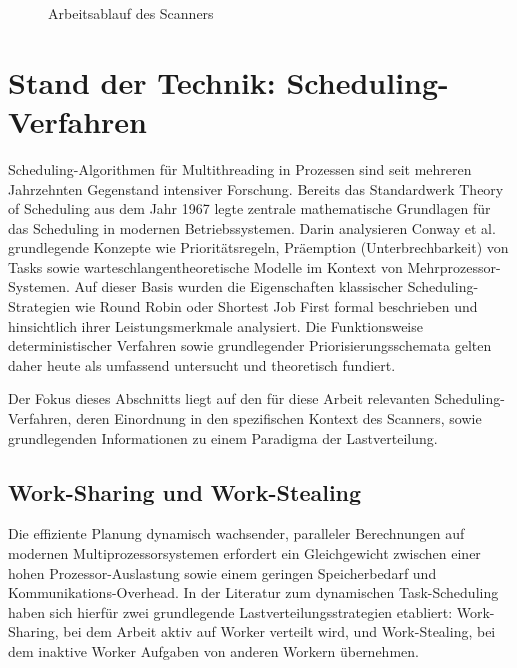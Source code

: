 \begin{sloppypar}
\begin{figure}[H]
{}
\caption{Arbeitsablauf des Scanners}
\label{fig:scanner-workflow}
\end{figure}



\section{Stand der Technik: Scheduling-Verfahren}

Scheduling-Algorithmen für Multithreading in Prozessen sind seit mehreren Jahrzehnten Gegenstand intensiver Forschung. 
Bereits das Standardwerk Theory of Scheduling aus dem Jahr 1967 \cite{Conway:1967} legte zentrale mathematische Grundlagen für das Scheduling in modernen Betriebssystemen. 
Darin analysieren Conway et al. grundlegende Konzepte wie Prioritätsregeln, Präemption (Unterbrechbarkeit) von Tasks sowie warteschlangentheoretische Modelle im Kontext von Mehrprozessor-Systemen. 
Auf dieser Basis wurden die Eigenschaften klassischer Scheduling-Strategien wie Round Robin oder Shortest Job First formal beschrieben und hinsichtlich ihrer Leistungsmerkmale analysiert. 
Die Funktionsweise deterministischer Verfahren sowie grundlegender Priorisierungsschemata gelten daher heute als umfassend untersucht und theoretisch fundiert.

\vspace{7.56mm}

\noindent Der Fokus dieses Abschnitts liegt auf den für diese Arbeit relevanten Scheduling-Verfahren, 
deren Einordnung in den spezifischen Kontext des Scanners, 
sowie grundlegenden Informationen zu einem Paradigma der Lastverteilung.

\subsection{Work-Sharing und Work-Stealing}

Die effiziente Planung dynamisch wachsender, paralleler Berechnungen auf modernen Multiprozessorsystemen erfordert ein Gleichgewicht zwischen einer hohen Prozessor-Auslastung sowie einem geringen Speicherbedarf und Kommunikations-Overhead.
In der Literatur zum dynamischen Task-Scheduling haben sich hierfür zwei grundlegende Lastverteilungsstrategien etabliert: 
Work-Sharing, bei dem Arbeit aktiv auf Worker verteilt wird, und Work-Stealing, bei dem inaktive Worker Aufgaben von anderen Workern übernehmen.
\vspace{7.56mm}


\end{sloppypar}

